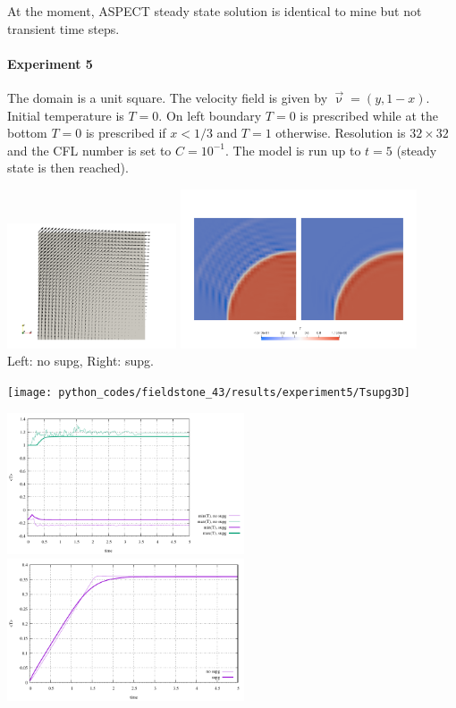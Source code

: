 At the moment, ASPECT steady state solution is identical to mine but not transient time steps.  

\paragraph{Experiment 5}

The domain is a unit square. The velocity field is given by $\vec\upnu=(y,1-x)$. Initial temperature is 
$T=0$. On left boundary $T=0$ is prescribed while at the bottom $T=0$ is prescribed if $x<1/3$ and $T=1$
otherwise. Resolution is $32\times32$ and the CFL number is set to $C=10^{-1}$. The model is run up to $t=5$ (steady
state is then reached).

\begin{center}
\includegraphics[width=5cm]{python_codes/fieldstone_43/results/experiment5/vel}
\includegraphics[width=7cm]{python_codes/fieldstone_43/results/experiment5/T}\\
{\captionfont Left: no supg, Right: supg.}
\end{center}

\texttt{[image: python\_codes/fieldstone\_43/results/experiment5/Tsupg3D]}

\begin{center}
\includegraphics[width=7cm]{python_codes/fieldstone_43/results/experiment5/stats_T}
\includegraphics[width=7cm]{python_codes/fieldstone_43/results/experiment5/avrg_T}
\end{center}






